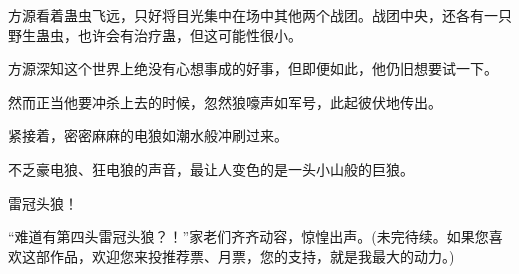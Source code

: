 \begin{this_body}
方源看着蛊虫飞远，只好将目光集中在场中其他两个战团。战团中央，还各有一只野生蛊虫，也许会有治疗蛊，但这可能性很小。

方源深知这个世界上绝没有心想事成的好事，但即便如此，他仍旧想要试一下。

然而正当他要冲杀上去的时候，忽然狼嚎声如军号，此起彼伏地传出。

紧接着，密密麻麻的电狼如潮水般冲刷过来。

不乏豪电狼、狂电狼的声音，最让人变色的是一头小山般的巨狼。

雷冠头狼！

“难道有第四头雷冠头狼？！”家老们齐齐动容，惊惶出声。(未完待续。如果您喜欢这部作品，欢迎您来投推荐票、月票，您的支持，就是我最大的动力。)

\end{this_body}

